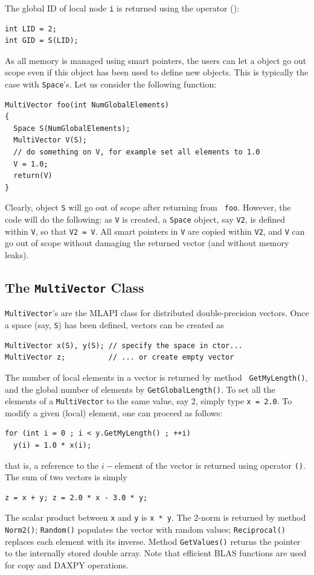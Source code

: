 \documentclass{article}[11pt]
\newcommand{\MLAPI}  {{\sc MLAPI }}
\begin{document}
The global ID of local node {\tt i} is returned using the operator ():
\begin{verbatim}
int LID = 2;
int GID = S(LID);
\end{verbatim}

\smallskip

As all memory is managed using smart pointers, the users can let a object go
out scope even if this object has been used to define new objects. This is
typically the case with {\tt Space}'s. Let us consider the following function:
\begin{verbatim}
MultiVector foo(int NumGlobalElements)
{
  Space S(NumGlobalElements);
  MultiVector V(S);
  // do something on V, for example set all elements to 1.0
  V = 1.0;
  return(V)
}
\end{verbatim}
Clearly, object {\tt S} will go out of scope after returning from {\tt
  foo}. However, the code will do the following:
as {\tt V} is created, a {\tt Space} object, say {\tt V2}, is defined
within {\tt V}, so that {\tt V2 = V}. All smart pointers in {\tt V} are copied
within {\tt V2}, and {\tt V} can go out of scope without damaging the
returned vector (and without memory leaks).

\subsection{The {\tt MultiVector} Class}
\label{sec:multivector}

{\tt MultiVector}'s are the \MLAPI class for distributed double-precision
vectors. Once a space (say, {\tt S}) has been defined, vectors can be created
as
\begin{verbatim}
MultiVector x(S), y(S); // specify the space in ctor...
MultiVector z;          // ... or create empty vector
\end{verbatim}

The number of local elements in a vector is returned by method {\tt
  GetMyLength()}, and the global number of elements by
{\tt GetGlobalLength()}. To set all the elements of a {\tt MultiVector} to the same value, say 2, simply type {\tt x = 2.0}. To modify a given (local) element, one can proceed as follows:
\begin{verbatim}
for (int i = 0 ; i < y.GetMyLength() ; ++i)
  y(i) = 1.0 * x(i);
\end{verbatim}
that is, a reference to the $i-$element of the vector is returned using
operator \verb!()!.  The sum of two vectors is simply
\begin{verbatim}
z = x + y; z = 2.0 * x - 3.0 * y; 
\end{verbatim}
The scalar product between {\tt x} and {\tt y} is {\tt x * y}. The 2-norm is
returned by method {\tt Norm2()}; {\tt Random()} populates the vector with
random values; {\tt Reciprocal()} replaces each element with its inverse. 
Method {\tt GetValues()} returns the pointer to the internally stored double
array. Note
that efficient BLAS functions are used for copy and DAXPY operations. 
\end{document}
